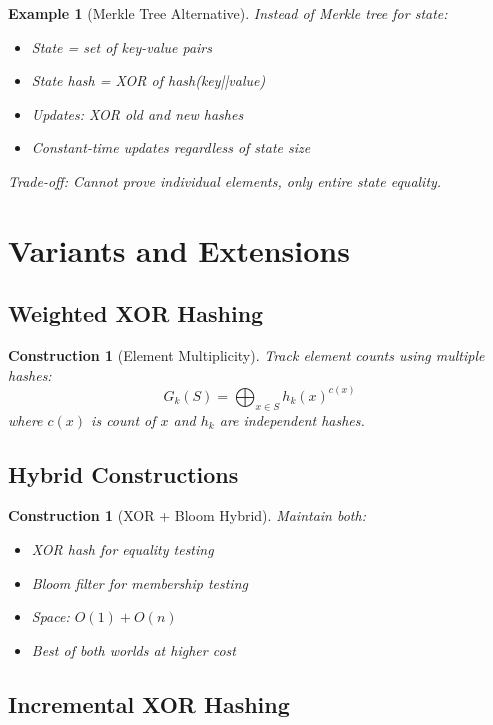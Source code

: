 \documentclass[11pt,final,hidelinks]{article}
\newtheorem{example}[theorem]{Example}
\newtheorem{construction}[theorem]{Construction}
\begin{document}
\begin{example}[Merkle Tree Alternative]
Instead of Merkle tree for state:
\begin{itemize}
    \item State = set of key-value pairs
    \item State hash = XOR of hash(key||value)
    \item Updates: XOR old and new hashes
    \item Constant-time updates regardless of state size
\end{itemize}
Trade-off: Cannot prove individual elements, only entire state equality.
\end{example}

\section{Variants and Extensions}

\subsection{Weighted XOR Hashing}

\begin{construction}[Element Multiplicity]
Track element counts using multiple hashes:
\begin{equation}
G_k(S) = \bigoplus_{x \in S} h_k(x)^{c(x)}
\end{equation}
where $c(x)$ is count of $x$ and $h_k$ are independent hashes.
\end{construction}

\subsection{Hybrid Constructions}

\begin{construction}[XOR + Bloom Hybrid]
Maintain both:
\begin{itemize}
    \item XOR hash for equality testing
    \item Bloom filter for membership testing
    \item Space: $O(1) + O(n)$
    \item Best of both worlds at higher cost
\end{itemize}
\end{construction}

\subsection{Incremental XOR Hashing}
\end{document}
